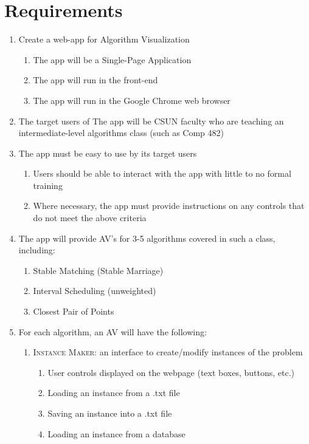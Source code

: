 \section{Requirements}
\label{requirements}
\begin{enumerate}
	\item Create a web-app for Algorithm Visualization 
	\begin{enumerate}
		\item The app will be a Single-Page Application
		\item The app will run in the front-end
		\item The app will run in the Google Chrome web browser
	\end{enumerate}
	\item The target users of The app will be CSUN faculty 
	who are teaching an intermediate-level 
	algorithms class (such as Comp 482)
	\item The app must be easy to use by its target users
	\begin{enumerate}
		\item Users should be able to interact with the app with 
			little to no formal training
		\item Where necessary, the app must provide instructions on 
			any controls that do not meet the above criteria
	\end{enumerate}
	\item The app will provide AV's for 3-5 algorithms 
		covered in such a class, including: 
		\begin{enumerate}
			\item Stable Matching (Stable Marriage)
			\item Interval Scheduling (unweighted)
			\item Closest Pair of Points
		\end{enumerate}
	\item For each algorithm, an AV will have the following:
	\begin{enumerate}
		\item \textsc{Instance Maker}: an interface to create/modify instances of the problem
		\begin{enumerate}
			\item User controls displayed on the webpage (text boxes, buttons, etc.)
			\item Loading an instance from a .txt file
			\item Saving an instance into a .txt file
			\item Loading an instance from a database

\end{enumerate}
\end{enumerate}
\end{enumerate}
